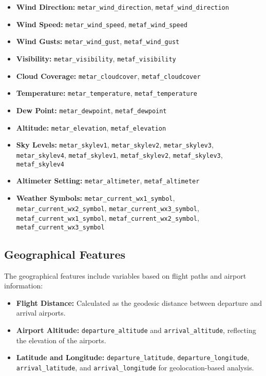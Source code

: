 \begin{itemize}
    \item \textbf{Wind Direction:} \texttt{metar\_wind\_direction}, \texttt{metaf\_wind\_direction}
    \item \textbf{Wind Speed:} \texttt{metar\_wind\_speed}, \texttt{metaf\_wind\_speed}
    \item \textbf{Wind Gusts:} \texttt{metar\_wind\_gust}, \texttt{metaf\_wind\_gust}
    \item \textbf{Visibility:} \texttt{metar\_visibility}, \texttt{metaf\_visibility}
    \item \textbf{Cloud Coverage:} \texttt{metar\_cloudcover}, \texttt{metaf\_cloudcover}
    \item \textbf{Temperature:} \texttt{metar\_temperature}, \texttt{metaf\_temperature}
    \item \textbf{Dew Point:} \texttt{metar\_dewpoint}, \texttt{metaf\_dewpoint}
    \item \textbf{Altitude:} \texttt{metar\_elevation}, \texttt{metaf\_elevation}
    \item \textbf{Sky Levels:} \texttt{metar\_skylev1}, \texttt{metar\_skylev2}, \texttt{metar\_skylev3}, \texttt{metar\_skylev4}, \texttt{metaf\_skylev1}, \texttt{metaf\_skylev2}, \texttt{metaf\_skylev3}, \texttt{metaf\_skylev4}
    \item \textbf{Altimeter Setting:} \texttt{metar\_altimeter}, \texttt{metaf\_altimeter}
    \item \textbf{Weather Symbols:} \texttt{metar\_current\_wx1\_symbol}, \texttt{metar\_current\_wx2\_symbol}, \texttt{metar\_current\_wx3\_symbol}, \texttt{metaf\_current\_wx1\_symbol}, \texttt{metaf\_current\_wx2\_symbol}, \texttt{metaf\_current\_wx3\_symbol}
\end{itemize}

\subsection{Geographical Features}
The geographical features include variables based on flight paths and airport information:

\begin{itemize}
    \item \textbf{Flight Distance:} Calculated as the geodesic distance between departure and arrival airports.
    \item \textbf{Airport Altitude:} \texttt{departure\_altitude} and \texttt{arrival\_altitude}, reflecting the elevation of the airports.
    \item \textbf{Latitude and Longitude:} \texttt{departure\_latitude}, \texttt{departure\_longitude}, \texttt{arrival\_latitude}, and \texttt{arrival\_longitude} for geolocation-based analysis.
\end{itemize}

